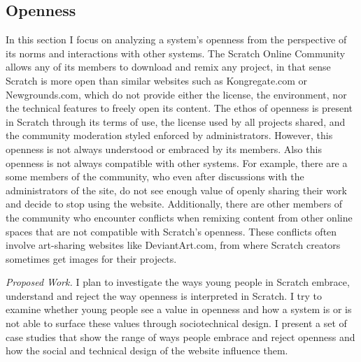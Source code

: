 
\subsection{Openness}
In this section I focus on analyzing a system's openness from the perspective of its norms and interactions with other systems.
The Scratch Online Community allows any of its members to download and remix any project, in that sense Scratch is more open than similar websites such as Kongregate.com or Newgrounds.com, which do not provide either the license, the environment, nor the technical features to freely open its content. 
The ethos of openness is present in Scratch through its terms of use, the license used by all projects shared, and the community moderation styled enforced by administrators.
However, this openness is not always understood or embraced by its members.
Also this openness is not always compatible with other systems.
For example, there are a some members of the community, who even after discussions with the administrators of the site, do not see enough value of openly sharing their work and decide to stop using the website. 
Additionally, there are other members of the community who encounter conflicts when remixing content from other online spaces that are not compatible with Scratch's openness. 
These conflicts often involve art-sharing websites like DeviantArt.com, from where Scratch creators sometimes get images for their projects.

\emph{Proposed Work.}
I plan to investigate the ways young people in Scratch embrace, understand and reject the way openness is interpreted in Scratch.
I try to examine whether young people see a value in openness and how a system is or is not able to surface these values through sociotechnical design.
I present a set of case studies that show the range of ways people embrace and reject openness and how the social and technical design of the website influence them. 

